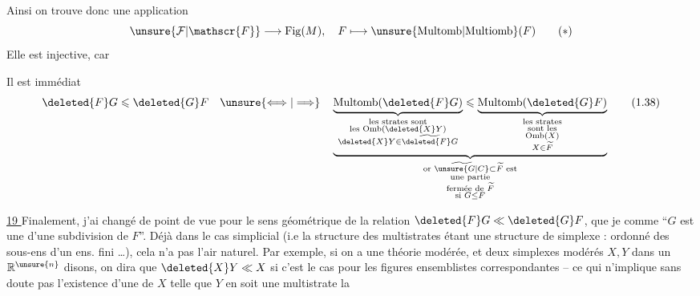 
Ainsi on trouve donc une application
\[
 \unsure{\mathcal{F}|\mathscr{F}}\longrightarrow\mathrm{Fig}(M),\quad F\longmapsto\unsure{\mathrm{Multomb}|\mathrm{Multiomb}}(F)
 \tag*{$(*)$}
\]
Elle est injective, car 

Il est immédiat 
\[
 \deleted{F}G\leqslant\deleted{G}F\quad
 \unsure{\Longleftrightarrow|\Longrightarrow}\quad
 \underbrace{
 \underbrace{\mathrm{Multomb}(\deleted{F}G)}_{
 \substack{\text{les strates sont}\\\text{les }\mathrm{Omb}(\deleted{X}Y)\\\deleted{X}Y\in\widetilde{\deleted{F}G}}}
 \leqslant
 \underbrace{\mathrm{Multomb}(\deleted{G}F)}_{
 \substack{\text{les strates}\\\text{sont les}\\\mathrm{Omb}(X)\\X\in\widetilde F}}}_{
 \substack{\text{or }\widetilde{\unsure{G|C}}\subset\widetilde F\text{ est}\\
 \text{une partie}\\\text{fermée de }\widetilde F\\\text{si }G\leq F}}
 \tag*{(1.38)}
\]

\uline{19 }\qquad Finalement, j'ai changé de point de vue pour le sens géométrique de la relation $\deleted{F}G\ll\deleted{G}F$, que je  comme ``$G$ est une  d'une subdivision de $F$''. Déjà dans  le cas simplicial (i.e la structure  des  multistrates étant  une structure de simplexe :  ordonné des sous-ens d'un ens. fini \ldots), cela n'a pas l'air naturel. Par exemple, si on a une théorie modérée, et deux simplexes modérés $X,Y$ dans un $\mathbb{R}^{\unsure{n}}$ disons, on dira que $\deleted{X}Y\ll X$ si c'est le cas pour les figures ensemblistes correspondantes -- ce qui n'implique sans doute pas l'existence d'une  de $X$ telle que $Y$ en soit une multistrate  la

